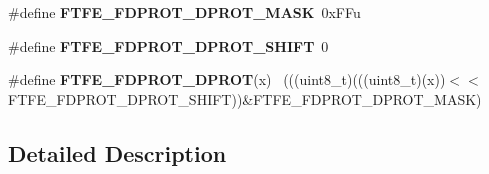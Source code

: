 \begin{DoxyCompactItemize}
\item 
\hypertarget{group___f_t_f_e___register___masks_ga04902a698b747ed3e15ec54795ea38ce}{}\#define {\bfseries F\+T\+F\+E\+\_\+\+F\+D\+P\+R\+O\+T\+\_\+\+D\+P\+R\+O\+T\+\_\+\+M\+A\+S\+K}~0x\+F\+Fu\label{group___f_t_f_e___register___masks_ga04902a698b747ed3e15ec54795ea38ce}

\item 
\hypertarget{group___f_t_f_e___register___masks_gaa0430b877bb9f714aa8192ac4eb3980f}{}\#define {\bfseries F\+T\+F\+E\+\_\+\+F\+D\+P\+R\+O\+T\+\_\+\+D\+P\+R\+O\+T\+\_\+\+S\+H\+I\+F\+T}~0\label{group___f_t_f_e___register___masks_gaa0430b877bb9f714aa8192ac4eb3980f}

\item 
\hypertarget{group___f_t_f_e___register___masks_gaa9db1c9b086653bdabe7d24d0d6719ce}{}\#define {\bfseries F\+T\+F\+E\+\_\+\+F\+D\+P\+R\+O\+T\+\_\+\+D\+P\+R\+O\+T}(x)                                      ~(((uint8\+\_\+t)(((uint8\+\_\+t)(x))$<$$<$F\+T\+F\+E\+\_\+\+F\+D\+P\+R\+O\+T\+\_\+\+D\+P\+R\+O\+T\+\_\+\+S\+H\+I\+F\+T))\&F\+T\+F\+E\+\_\+\+F\+D\+P\+R\+O\+T\+\_\+\+D\+P\+R\+O\+T\+\_\+\+M\+A\+S\+K)\label{group___f_t_f_e___register___masks_gaa9db1c9b086653bdabe7d24d0d6719ce}

\end{DoxyCompactItemize}


\subsection{Detailed Description}
